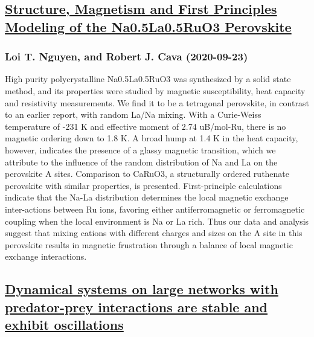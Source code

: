 \subsection*{\href{http://arxiv.org/abs/2009.11215v1}{Structure, Magnetism and First Principles Modeling of the Na0.5La0.5RuO3  Perovskite}}
\subsubsection*{Loi T. Nguyen, and Robert J. Cava (2020-09-23)}
High purity polycrystalline Na0.5La0.5RuO3 was synthesized by a solid state
method, and its properties were studied by magnetic susceptibility, heat
capacity and resistivity measurements. We find it to be a tetragonal
perovskite, in contrast to an earlier report, with random La/Na mixing. With a
Curie-Weiss temperature of -231 K and effective moment of 2.74 uB/mol-Ru, there
is no magnetic ordering down to 1.8 K. A broad hump at 1.4 K in the heat
capacity, however, indicates the presence of a glassy magnetic transition,
which we attribute to the influence of the random distribution of Na and La on
the perovskite A sites. Comparison to CaRuO3, a structurally ordered ruthenate
perovskite with similar properties, is presented. First-principle calculations
indicate that the Na-La distribution determines the local magnetic exchange
inter-actions between Ru ions, favoring either antiferromagnetic or
ferromagnetic coupling when the local environment is Na or La rich. Thus our
data and analysis suggest that mixing cations with different charges and sizes
on the A site in this perovskite results in magnetic frustration through a
balance of local magnetic exchange interactions.

\subsection*{\href{http://arxiv.org/abs/2009.11211v1}{Dynamical systems on large networks with predator-prey interactions are  stable and exhibit oscillations}}
